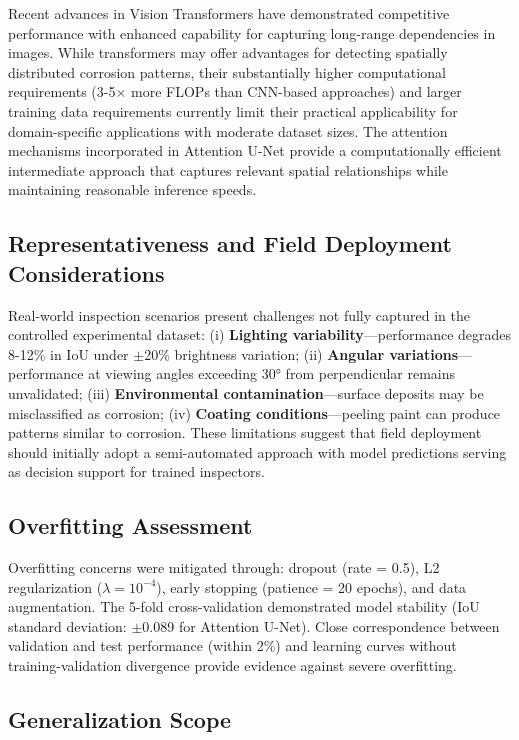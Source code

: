 \documentclass[Journal,letterpaper]{ascelike-new}
\begin{document}
Recent advances in Vision Transformers have demonstrated competitive performance with enhanced capability for capturing long-range dependencies in images. While transformers may offer advantages for detecting spatially distributed corrosion patterns, their substantially higher computational requirements (3-5$\times$ more FLOPs than CNN-based approaches) and larger training data requirements currently limit their practical applicability for domain-specific applications with moderate dataset sizes. The attention mechanisms incorporated in Attention U-Net provide a computationally efficient intermediate approach that captures relevant spatial relationships while maintaining reasonable inference speeds.

\subsection{Representativeness and Field Deployment Considerations}
\label{subsec:representativeness}

Real-world inspection scenarios present challenges not fully captured in the controlled experimental dataset: (i) \textbf{Lighting variability}---performance degrades 8-12\% in IoU under $\pm$20\% brightness variation; (ii) \textbf{Angular variations}---performance at viewing angles exceeding 30° from perpendicular remains unvalidated; (iii) \textbf{Environmental contamination}---surface deposits may be misclassified as corrosion; (iv) \textbf{Coating conditions}---peeling paint can produce patterns similar to corrosion. These limitations suggest that field deployment should initially adopt a semi-automated approach with model predictions serving as decision support for trained inspectors.

\subsection{Overfitting Assessment}
\label{subsec:overfitting}

Overfitting concerns were mitigated through: dropout (rate = 0.5), L2 regularization ($\lambda = 10^{-4}$), early stopping (patience = 20 epochs), and data augmentation. The 5-fold cross-validation demonstrated model stability (IoU standard deviation: $\pm$0.089 for Attention U-Net). Close correspondence between validation and test performance (within 2\%) and learning curves without training-validation divergence provide evidence against severe overfitting.

\subsection{Generalization Scope}
\label{subsec:generalization}
\end{document}

